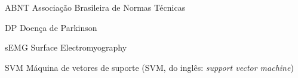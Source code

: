 \begin{siglas}
  \item[ABNT] Associação Brasileira de Normas Técnicas
  \item[DP] Doença de Parkinson
  \item[sEMG] Surface Electromyography
  \item[SVM] Máquina de vetores de suporte (SVM, do inglês: \textit{support vector machine}) 
\end{siglas}
